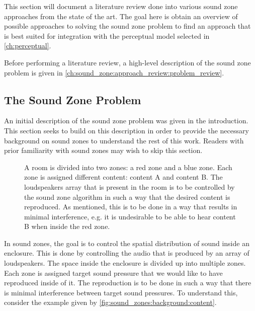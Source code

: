 This section will document a literature review done into various sound zone approaches from the state of the art.
The goal here is obtain an overview of possible approaches to solving the sound zone problem to find an approach that is best suited for integration with
the perceptual model selected in \autoref{ch:perceptual}.

Before performing a literature review, a high-level description of the sound zone problem is given in \autoref{ch:sound_zone:approach_review:problem_review}.

\subsection{The Sound Zone Problem}
\label{ch:sound_zone:approach_review:problem_review}
An initial description of the sound zone problem was given in the introduction.
This section seeks to build on this description in order to provide the necessary background on sound zones to understand the rest of this work.
Readers with prior familiarity with sound zones may wish to skip this section.

\begin{figure}[t]
    \centering
    \scalebox{1.0}{}
    \caption{A room is divided into two zones: a red zone and a blue zone.
        Each zone is assigned different content: content A and content B.
        The loudspeakers array that is present in the room is to be controlled by the sound zone algorithm 
        in such a way that the desired content is reproduced.
        As mentioned, this is to be done in a way that results in minimal interference, e.g. it is undesirable
        to be able to hear content B when inside the red zone.}
    \label{fig:sound_zones:background:content}
\end{figure}

In sound zones, the goal is to control the spatial distribution of sound inside an enclosure.
This is done by controlling the audio that is produced by an array of loudspeakers.
The space inside the enclosure is divided up into multiple zones.
Each zone is assigned target sound pressure that we would like to have reproduced inside of it.
The reproduction is to be done in such a way that there is minimal interference between target sound pressures.
To understand this, consider the example given by \autoref{fig:sound_zones:background:content}.

